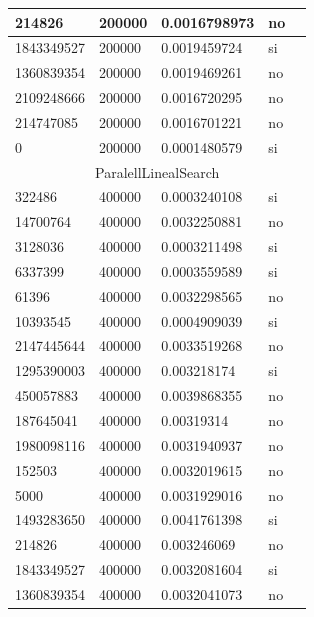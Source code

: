 \documentclass[12pt, fleqn]{article}                             %
\theoremstyle{break}                                            %
\begin{document}
\begin{longtable}{|m{5em}|m{5em}|m{10em}|m{5em}|@{}m{0pt}@{}}
            214826& 200000  & 0.0016798973 & no &\\[1em]    \hline
            1843349527& 200000  & 0.0019459724 & si &\\[1em]    \hline
            1360839354& 200000  & 0.0019469261 & no &\\[1em]    \hline
            2109248666& 200000  & 0.0016720295 & no &\\[1em]    \hline
            214747085& 200000  & 0.0016701221 & no &\\[1em]    \hline
            0& 200000  & 0.0001480579 & si &\\[1em]    \hline
            \multicolumn{5}{|c|}{ParalellLinealSearch}   \\          \hline
            322486& 400000  & 0.0003240108 & si &\\[1em]    \hline
            14700764& 400000  & 0.0032250881 & no &\\[1em]    \hline
            3128036& 400000  & 0.0003211498 & si &\\[1em]    \hline
            6337399& 400000  & 0.0003559589 & si &\\[1em]    \hline
            61396& 400000  & 0.0032298565 & no &\\[1em]    \hline
            10393545& 400000  & 0.0004909039 & si &\\[1em]    \hline
            2147445644& 400000  & 0.0033519268 & no &\\[1em]    \hline
            1295390003& 400000  & 0.003218174 & si &\\[1em]    \hline
            450057883& 400000  & 0.0039868355 & no &\\[1em]    \hline
            187645041& 400000  & 0.00319314 & no &\\[1em]    \hline
            1980098116& 400000  & 0.0031940937 & no &\\[1em]    \hline
            152503& 400000  & 0.0032019615 & no &\\[1em]    \hline
            5000& 400000  & 0.0031929016 & no &\\[1em]    \hline
            1493283650& 400000  & 0.0041761398 & si &\\[1em]    \hline
            214826& 400000  & 0.003246069 & no &\\[1em]    \hline
            1843349527& 400000  & 0.0032081604 & si &\\[1em]    \hline
            1360839354& 400000  & 0.0032041073 & no &\\[1em]    \hline

\end{longtable}
\end{document}
